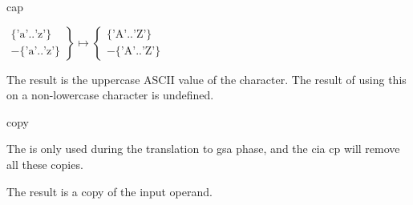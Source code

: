 \begin{instruction}{cap}

  \begin{results}
  \item
    $
    \left.
      \begin{array}{r}
        \{\textrm{'a'..'z'}\} \\
        -\{\textrm{'a'..'z'}\}
      \end{array}
    \right\}
    \mapsto
    \left\{
      \begin{array}{r}
        \{\textrm{'A'..'Z'}\} \\
        -\{\textrm{'A'..'Z'}\}
      \end{array}
    \right.
    $

    The result is the uppercase ASCII value of the character.  The
    result of using this on a non-lowercase character is undefined.
  \end{results}

  \begin{operands}
  \item {}
  \end{operands}
\end{instruction}

\begin{instruction}{copy}

  \begin{notes}
    The  is only used during the translation to \ac{gsa}
    phase, and the \ac{cia} \ac{cp} will remove all these copies.
  \end{notes}

  \begin{results}
  \item The result is a copy of the input operand.
  \end{results}

  \begin{operands}
  \item {}
  \end{operands}
\end{instruction}

